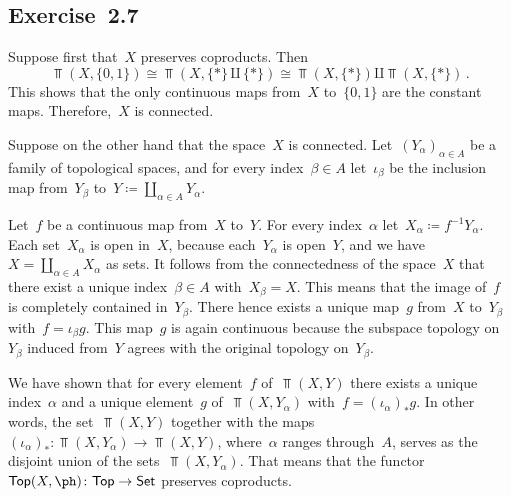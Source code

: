 \subsection{Exercise~2.7}
\label{exercise 2.7}

Suppose first that~$X$ preserves coproducts.
Then
\[
	\Top(X, \{0, 1\})
	≅
	\Top(X, \{ \ast \} ⨿ \{ \ast \})
	≅
	\Top(X, \{ \ast \}) ⨿ \Top(X, \{ \ast \}) \,.
\]
This shows that the only continuous maps from~$X$ to~$\{0, 1\}$ are the constant maps.
Therefore,~$X$ is connected.

Suppose on the other hand that the space~$X$ is connected.
Let~$(Y_α)_{α ∈ A}$ be a family of topological spaces, and for every index~$β ∈ A$ let~$ι_β$ be the inclusion map from~$Y_β$ to~$Y ≔ ∐_{α ∈ A} Y_α$.

Let~$f$ be a continuous map from~$X$ to~$Y$.
For every index~$α$ let~$X_α ≔ f^{-1} Y_α$.
Each set~$X_α$ is open in~$X$, because each~$Y_α$ is open~$Y$, and we have~$X = ∐_{α ∈ A} X_α$ as sets.
It follows from the connectedness of the space~$X$ that there exist a unique index~$β ∈ A$ with~$X_β = X$.
This means that the image of~$f$ is completely contained in~$Y_β$.
There hence exists a unique map~$g$ from~$X$ to~$Y_β$ with~$f = ι_β g$.
This map~$g$ is again continuous because the subspace topology on~$Y_β$ induced from~$Y$ agrees with the original topology on~$Y_β$.

We have shown that for every element~$f$ of~$\Top(X, Y)$ there exists a unique index~$α$ and a unique element~$g$ of~$\Top(X, Y_α)$ with~$f = (ι_α)_* g$.
In other words, the set~$\Top(X, Y)$ together with the maps~$(ι_α)_* \colon \Top(X, Y_α) \to \Top(X, Y)$, where~$α$ ranges through~$A$, serves as the disjoint union of the sets~$\Top(X, Y_α)$.
That means that the functor~$\Top(X, \ph) \colon \Top \to \Set$ preserves coproducts.
